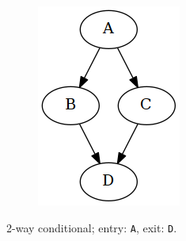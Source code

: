 \begin{figure}[htbp]
\begin{subfigure}[ht]{0.23\textwidth}
		\label{fig:if_graph_representation}
	\end{subfigure}
	\qquad
	\begin{subfigure}[ht]{0.28\textwidth}
		\centering
		\begin{subfigure}[ht]{0.45\textwidth}
			
		\end{subfigure}
		\begin{subfigure}[ht]{0.50\textwidth}
			\includegraphics[width=\textwidth]{inc/primitives/if_else.png}
		\end{subfigure}
		\caption{2-way conditional; entry: \texttt{A}, exit: \texttt{D}.}
		\label{fig:if_else_graph_representation}
	\end{subfigure}
	\qquad
	\begin{subfigure}[ht]{0.30\textwidth}
		\centering

\end{subfigure}
\end{figure}
